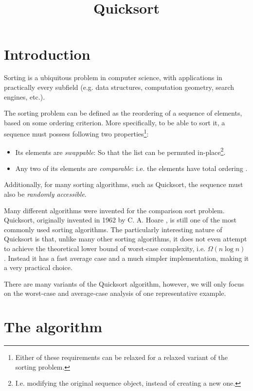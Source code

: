 \documentclass[]{finalproject}
\title{Quicksort}
\subtitle{}
\begin{document}
\maketitle

\section{Introduction} \label{introduction}

Sorting is a ubiquitous problem in computer science, with applications in practically every subfield
(e.g. data structures, computation geometry, search engines, etc.).

The sorting problem can be defined as the reordering of a sequence of elements, based on some ordering criterion.
More specifically, to be able to sort it, a sequence must possess following two 
properties\footnote{Either of these requirements can be relaxed for a relaxed variant of the sorting problem.}:

\begin{itemize}
\item Its elements are \textit{swappable}: So that the list can be permuted in-place\footnote{I.e. modifying the original sequence object, instead of creating a new one.}.
\item Any two of its elements are \textit{comparable}: i.e. the elements have total ordering \cite{towiki}.
\end{itemize}

Additionally, for many sorting algorithms, such as Quicksort, the sequence must also be \textit{randomly accessible}.

Many different algorithms were invented for the comparison sort problem. Quicksort, originally invented in 1962 by C. A. Hoare \cite{hoare1962quicksort}, is still one of the most commonly used sorting algorithms. The particularly interesting nature of Quicksort is that, unlike many other sorting algorithms, it does not even attempt to achieve the theoretical lower bound of worst-case complexity, i.e. $\Omega(n\log n)$ \cite[p.~193]{clrs}. Instead it has a fast average case and a much simpler implementation, making it a very practical choice.

There are many variants of the Quicksort algorithm, however, we will only focus on the worst-case and average-case analysis of one representative example.

\section{The algorithm}
\end{document}
